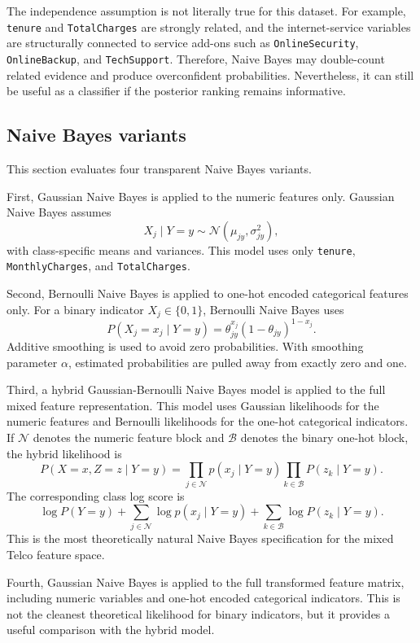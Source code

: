 The independence assumption is not literally true for this dataset. For example, \texttt{tenure} and \texttt{TotalCharges} are strongly related, and the internet-service variables are structurally connected to service add-ons such as \texttt{OnlineSecurity}, \texttt{OnlineBackup}, and \texttt{TechSupport}. Therefore, Naive Bayes may double-count related evidence and produce overconfident probabilities. Nevertheless, it can still be useful as a classifier if the posterior ranking remains informative.

\subsection{Naive Bayes variants}

This section evaluates four transparent Naive Bayes variants.

First, Gaussian Naive Bayes is applied to the numeric features only. Gaussian Naive Bayes assumes
\[
X_j\mid Y=y
\sim
\mathcal{N}(\mu_{jy},\sigma_{jy}^{2}),
\]
with class-specific means and variances. This model uses only \texttt{tenure}, \texttt{MonthlyCharges}, and \texttt{TotalCharges}.

Second, Bernoulli Naive Bayes is applied to one-hot encoded categorical features only. For a binary indicator \(X_j\in\{0,1\}\), Bernoulli Naive Bayes uses
\[
P(X_j=x_j\mid Y=y)
=
\theta_{jy}^{x_j}(1-\theta_{jy})^{1-x_j}.
\]
Additive smoothing is used to avoid zero probabilities. With smoothing parameter \(\alpha\), estimated probabilities are pulled away from exactly zero and one.

Third, a hybrid Gaussian-Bernoulli Naive Bayes model is applied to the full mixed feature representation. This model uses Gaussian likelihoods for the numeric features and Bernoulli likelihoods for the one-hot categorical indicators. If \(\mathcal{N}\) denotes the numeric feature block and \(\mathcal{B}\) denotes the binary one-hot block, the hybrid likelihood is
\[
P(X=x,Z=z\mid Y=y)
=
\prod_{j\in\mathcal{N}}
p(x_j\mid Y=y)
\prod_{k\in\mathcal{B}}
P(z_k\mid Y=y).
\]
The corresponding class log score is
\[
\log P(Y=y)
+
\sum_{j\in\mathcal{N}}
\log p(x_j\mid Y=y)
+
\sum_{k\in\mathcal{B}}
\log P(z_k\mid Y=y).
\]
This is the most theoretically natural Naive Bayes specification for the mixed Telco feature space.

Fourth, Gaussian Naive Bayes is applied to the full transformed feature matrix, including numeric variables and one-hot encoded categorical indicators. This is not the cleanest theoretical likelihood for binary indicators, but it provides a useful comparison with the hybrid model.

